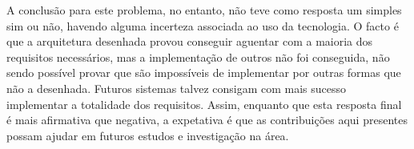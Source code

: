 A conclusão para este problema, no entanto, não teve como resposta um simples sim ou não, havendo alguma incerteza associada ao uso da tecnologia. O facto é que a arquitetura desenhada provou conseguir aguentar com a maioria dos requisitos necessários, mas a implementação de outros não foi conseguida, não sendo possível provar que são impossíveis de implementar por outras formas que não a desenhada. Futuros sistemas talvez consigam com mais sucesso implementar a totalidade dos requisitos. Assim, enquanto que esta resposta final é mais afirmativa que negativa, a expetativa é que as contribuições aqui presentes possam ajudar em futuros estudos e investigação na área.






